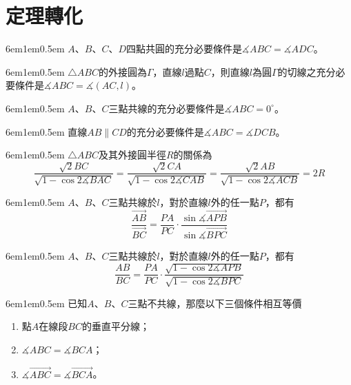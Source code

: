 \documentclass[12pt]{article}
\begin{document}
\section{定理轉化}
\begin{mybox}[四點共圓]{6em}{1em}{0.5em}
    $A$、$B$、$C$、$D$四點共圓的充分必要條件是$\measuredangle{ABC}=\measuredangle{ADC}$。
\end{mybox}
\begin{mybox}[弦切角定理]{6em}{1em}{0.5em}
    $\triangle{ABC}$的外接圓為$\Gamma$，直線$l$過點$C$，則直線$l$為圓$\Gamma$的切線之充分必要條件是$\measuredangle{ABC}=\measuredangle{\left(AC,l\right)}$。
\end{mybox}
\begin{mybox}[三點共線]{6em}{1em}{0.5em}
    $A$、$B$、$C$三點共線的充分必要條件是$\measuredangle{ABC}=0^{\circ}$。
\end{mybox}
\begin{mybox}[兩直線平行]{6em}{1em}{0.5em}
    直線$AB\parallel CD$的充分必要條件是$\measuredangle{ABC}=\measuredangle{DCB}$。
\end{mybox}
\begin{mybox}[正弦定理]{6em}{1em}{0.5em}
    $\triangle{ABC}$及其外接圓半徑$R$的關係為
    $$
        \frac{\sqrt{2}BC}{\sqrt{1-\cos{2\measuredangle{BAC}}}}=\frac{\sqrt{2}CA}{\sqrt{1-\cos{2\measuredangle{CAB}}}}=\frac{\sqrt{2}AB}{\sqrt{1-\cos{2\measuredangle{ACB}}}}=2R
    $$
\end{mybox}
\begin{mybox}[有向分角定理]{6em}{1em}{0.5em}
    $A$、$B$、$C$三點共線於$l$，對於直線$l$外的任一點$P$，都有
    $$
        \frac{\overrightarrow{AB}}{\overrightarrow{BC}}=\frac{PA}{PC}\cdot\frac{\sin{\measuredangle{\overrightarrow{APB}}}}{\sin{\measuredangle{\overrightarrow{BPC}}}}
    $$
\end{mybox}
\begin{mybox}[無向分角定理]{6em}{1em}{0.5em}
    $A$、$B$、$C$三點共線於$l$，對於直線$l$外的任一點$P$，都有
    $$
        \frac{AB}{BC}=\frac{PA}{PC}\cdot\frac{\sqrt{1-\cos{2\measuredangle{APB}}}}{\sqrt{1-\cos{2\measuredangle{BPC}}}}
    $$
\end{mybox}
\begin{mybox}[垂直平分線]{6em}{1em}{0.5em}
    已知$A$、$B$、$C$三點不共線，那麼以下三個條件相互等價
    \begin{enumerate}[label=(\roman*.)]
        \item 點$A$在線段$BC$的垂直平分線；
        \item $\measuredangle{ABC}=\measuredangle{BCA}$；
        \item $\measuredangle{\overrightarrow{ABC}}=\measuredangle{\overrightarrow{BCA}}$。
    \end{enumerate}
\end{mybox}
\end{document}
